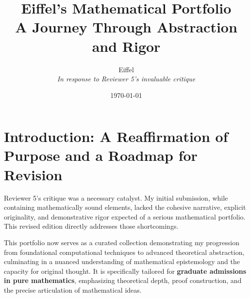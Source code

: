 \documentclass[11pt, a4paper]{article}
\title{\vspace{-2cm}\textbf{Eiffel's Mathematical Portfolio}\\[0.5cm] \Large A Journey Through Abstraction and Rigor}
\author{Eiffel \\ \small \textit{In response to Reviewer 5's invaluable critique}}
\date{\today}
\theoremstyle{plain} %
\theoremstyle{definition} %
\theoremstyle{remark} %
\begin{document}
\maketitle
\thispagestyle{empty} %

\newpage
\tableofcontents
\newpage

\section{Introduction: A Reaffirmation of Purpose and a Roadmap for Revision}
\label{sec:introduction}

Reviewer 5's critique was a necessary catalyst. My initial submission, while containing mathematically sound elements, lacked the cohesive narrative, explicit originality, and demonstrative rigor expected of a serious mathematical portfolio. This revised edition directly addresses those shortcomings.

This portfolio now serves as a curated collection demonstrating my progression from foundational computational techniques to advanced theoretical abstraction, culminating in a nuanced understanding of mathematical epistemology and the capacity for original thought. It is specifically tailored for \textbf{graduate admissions in pure mathematics}, emphasizing theoretical depth, proof construction, and the precise articulation of mathematical ideas.
\end{document}
